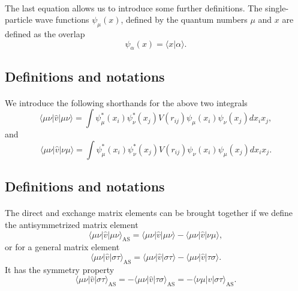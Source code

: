 \documentclass[%
twoside,                 %
final,                   %
10pt]{article}
\begin{document}
\paragraph{}
The last equation allows us to  introduce some further definitions.  
The single-particle wave functions $\psi_{\mu}(x)$, defined by the quantum numbers $\mu$ and $x$
are defined as the overlap 
\[
   \psi_{\alpha}(x)  = \langle x | \alpha \rangle .
\]



\subsection{Definitions and notations}

\paragraph{}
We introduce the following shorthands for the above two integrals
\[
\langle \mu\nu|\hat{v}|\mu\nu\rangle =  \int \psi_{\mu}^*(x_i)\psi_{\nu}^*(x_j)V(r_{ij})\psi_{\mu}(x_i)\psi_{\nu}(x_j)
    dx_ix_j,
\]
and
\[
\langle \mu\nu|\hat{v}|\nu\mu\rangle = \int \psi_{\mu}^*(x_i)\psi_{\nu}^*(x_j)
  V(r_{ij})\psi_{\nu}(x_i)\psi_{\mu}(x_j)
  dx_ix_j.  
\]



\subsection{Definitions and notations}

\paragraph{}
The direct and exchange matrix elements can be  brought together if we define the antisymmetrized matrix element
\[
\langle \mu\nu|\hat{v}|\mu\nu\rangle_{\mathrm{AS}}= \langle \mu\nu|\hat{v}|\mu\nu\rangle-\langle \mu\nu|\hat{v}|\nu\mu\rangle,
\]
or for a general matrix element  
\[
\langle \mu\nu|\hat{v}|\sigma\tau\rangle_{\mathrm{AS}}= \langle \mu\nu|\hat{v}|\sigma\tau\rangle-\langle \mu\nu|\hat{v}|\tau\sigma\rangle.
\]
It has the symmetry property
\[
\langle \mu\nu|\hat{v}|\sigma\tau\rangle_{\mathrm{AS}}= -\langle \mu\nu|\hat{v}|\tau\sigma\rangle_{\mathrm{AS}}=-\langle \nu\mu|\hat{v}|\sigma\tau\rangle_{\mathrm{AS}}.
\]
\end{document}
